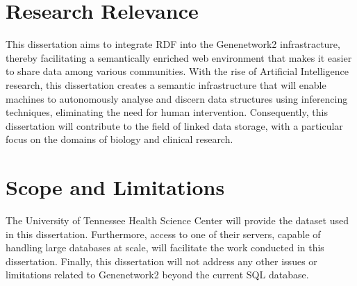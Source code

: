 \section{Research Relevance}

This dissertation aims to integrate RDF into the Genenetwork2 infrastracture, thereby facilitating a semantically enriched web environment that makes it easier to share data among various communities.  With the rise of Artificial Intelligence research, this dissertation creates a semantic infrastructure that will enable machines to autonomously analyse and discern data structures using inferencing techniques, eliminating the need for human intervention.  Consequently, this dissertation will contribute to the field of linked data storage, with a particular focus on the domains of biology and clinical research.

\section{Scope and Limitations}

The University of Tennessee Health Science Center will provide the dataset used in this dissertation.  Furthermore, access to one of their servers, capable of handling large databases at scale, will facilitate the work conducted in this dissertation.  Finally, this dissertation will not address any other issues or limitations related to Genenetwork2 beyond the current SQL database.

